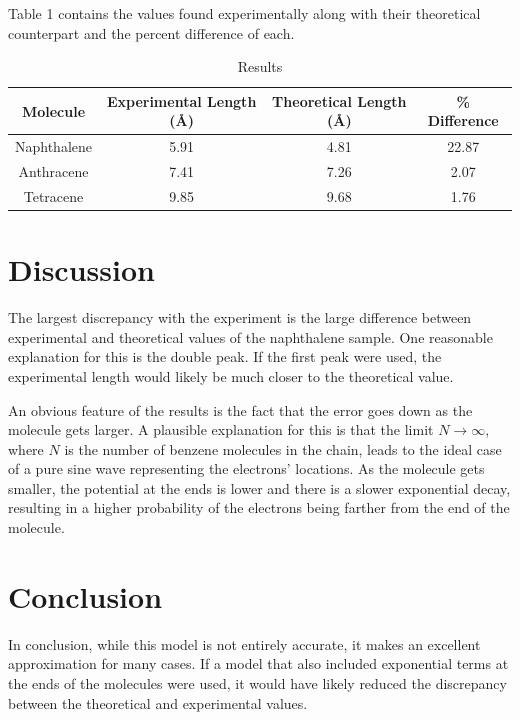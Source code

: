 \documentclass[10pt,a4paper]{article}
\begin{document}
Table 1 contains the values found experimentally along with their theoretical counterpart and the percent difference of each.

\begin{table}[h]
\begin{tabular}{cccc}
Molecule & Experimental Length (\AA) & Theoretical Length (\AA) & \% Difference \\
\hline
Naphthalene & 5.91 & 4.81 & 22.87 \\
Anthracene & 7.41 & 7.26 & 2.07\\
Tetracene & 9.85 & 9.68 &  1.76

\end{tabular}
\caption{Results}
\end{table}

\section*{Discussion}

The largest discrepancy with the experiment is the large difference between experimental and theoretical values of the naphthalene sample. One reasonable explanation for this is the double peak. If the first peak were used, the experimental length would likely be much closer to the theoretical value.

An obvious feature of the results is the fact that the error goes down as the molecule gets larger. A plausible explanation for this is that the limit $N \to \infty$, where $N$ is the number of benzene molecules in the chain, leads to the ideal case of a pure sine wave representing the electrons' locations. As the molecule gets smaller, the potential at the ends is lower and there is a slower exponential decay, resulting in a higher probability of the electrons being farther from the end of the molecule.

\section*{Conclusion}

In conclusion, while this model is not entirely accurate, it makes an excellent approximation for many cases. If a model that also included exponential terms at the ends of the molecules were used, it would have likely reduced the discrepancy between the theoretical and experimental values.
\end{document}
